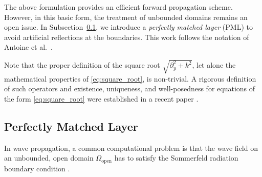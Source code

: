 \documentclass[11pt,a4paper]{article}
\theoremstyle{plain}%
\theoremstyle{definition}
\theoremstyle{remark}
\begin{document}
The above formulation provides an efficient forward propagation scheme. 
However, in this basic form, the treatment of unbounded domains remains an open issue.
In Subsection~\ref{sec:PML}, we introduce a \textit{perfectly matched layer} (PML) to avoid artificial reflections at the boundaries. 
This work follows the notation of Antoine et al.\  \cite{antoine2020pseudospectral}. 

Note that the proper definition of the square root $\sqrt{\partial_y^2 + k^2}$, let alone the mathematical properties of \eqref{eq:square_root}, is non-trivial.
A rigorous definition of such operators and existence, uniqueness, and well-posedness for equations of the form \eqref{eq:square_root} were established in a recent paper \cite{ehrhardt2025square}.



\subsection{Perfectly Matched Layer}\label{sec:PML}
In wave propagation, a common computational problem is that the wave field on an unbounded, open domain $\Omega_\mathrm{open}$ has to satisfy the Sommerfeld radiation boundary condition \cite{sommerfeld1912greensche}.
\end{document}
